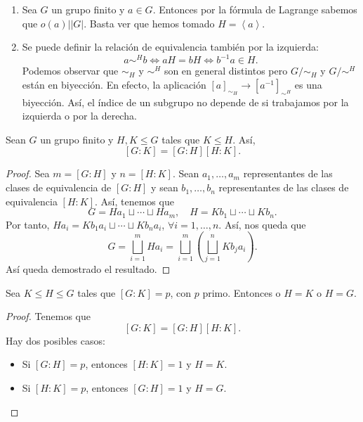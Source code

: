 \begin{observation}
\begin{enumerate}
\item Sea $\displaystyle G $ un grupo finito y $\displaystyle a \in G $. Entonces por la fórmula de Lagrange sabemos que $\displaystyle o\left(a\right) | \left|G\right| $. Basta ver que hemos tomado $\displaystyle H = \left\langle a \right\rangle  $.
\item Se puede definir la relación de equivalencia también por la izquierda:
	\[a \sim^{H}b \iff aH = bH \iff b^{-1}a \in H .\]
	Podemos observar que $\displaystyle \sim_{H} $ y $\displaystyle \sim^{H} $ son en general distintos pero $\displaystyle G/\sim_{H} $ y $\displaystyle G/\sim^{H} $ están en biyección. En efecto, la aplicación $\displaystyle [a]_{\sim_{H}} \to [a^{-1}]_{\sim^{H}} $ es una biyección. Así, el índice de un subgrupo no depende de si trabajamos por la izquierda o por la derecha.
\end{enumerate}
\end{observation}
\begin{prop}
Sean $\displaystyle G $ un grupo finito y $\displaystyle H,K \leq G $ tales que $\displaystyle K \leq H $. Así,
\[ [G:K] = [G:H] [H:K] .\]
\end{prop}
\begin{proof}
	Sea $\displaystyle m = [G:H] $ y $\displaystyle n = [H:K] $. Sean $\displaystyle a_{1}, \ldots, a_{m} $ representantes de las clases de equivalencia de $\displaystyle [G:H] $ y sean $\displaystyle b_{1}, \ldots, b_{n} $ representantes de las clases de equivalencia $\displaystyle [H:K] $. Así, tenemos que 
	\[G = Ha_{1} \sqcup \cdots \sqcup Ha_{m}, \quad H = Kb_{1} \sqcup \cdots \sqcup Kb_{n} .\]
	Por tanto, $\displaystyle Ha_{i} = Kb_{1}a_{i} \sqcup \cdots \sqcup Kb_{n}a_{i} $, $\displaystyle \forall i = 1, \ldots, n $. Así, nos queda que
	\[G = \bigsqcup_{i = 1}^{m}Ha_{i} = \bigsqcup_{i = 1}^{m}\left(\bigsqcup_{j = 1}^{n}Kb_{j}a_{i}\right) .\]
	Así queda demostrado el resultado. 
\end{proof}
\begin{colorary}
	Sea $\displaystyle K \leq H \leq G $ tales que $\displaystyle [G:K] = p $, con $\displaystyle p $ primo. Entonces o $\displaystyle H = K $ o $\displaystyle H = G $. 
\end{colorary}
\begin{proof}
Tenemos que 
\[[G:K] = [G : H] [H:K] .\]
Hay dos posibles casos:
\begin{itemize}
	\item Si $\displaystyle [G:H] =p $, entonces $\displaystyle [H:K] =1$ y $\displaystyle H = K $. 
	\item Si $\displaystyle [H:K] = p $, entonces $\displaystyle [G:H] =1$ y $\displaystyle H = G $. 
\end{itemize}
\end{proof}
